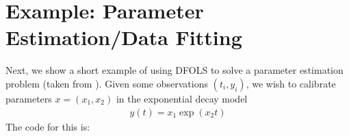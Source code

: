 \documentclass[letterpaper,10pt,english]{sphinxmanual}
\begin{document}
\section{Example: Parameter Estimation/Data Fitting}
\label{\detokenize{userguide:example-parameter-estimation-data-fitting}}
\sphinxAtStartPar
Next, we show a short example of using DFO\sphinxhyphen{}LS to solve a parameter estimation problem (taken from ). Given some observations \((t_i,y_i)\), we wish to calibrate parameters \(x=(x_1,x_2)\) in the exponential decay model
\begin{equation*}
\begin{split}y(t) = x_1 \exp(x_2 t)\end{split}
\end{equation*}
\sphinxAtStartPar
The code for this is:
\end{document}
